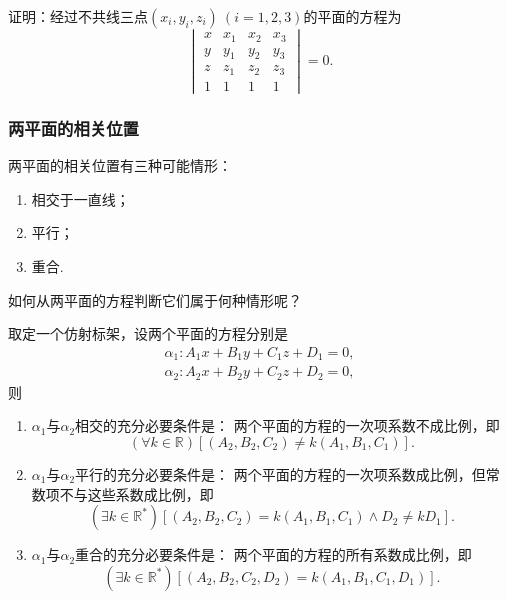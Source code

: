 \begin{example}
证明：经过不共线三点\((x_i,y_i,z_i)\ (i=1,2,3)\)的平面的方程为\[
	\begin{vmatrix}
		x & x_1 & x_2 & x_3 \\
		y & y_1 & y_2 & y_3 \\
		z & z_1 & z_2 & z_3 \\
		1 & 1 & 1 & 1
	\end{vmatrix} = 0.
\]
\end{example}

\subsubsection{两平面的相关位置}
两平面的相关位置有三种可能情形：
\begin{enumerate}
	\item 相交于一直线；
	\item 平行；
	\item 重合.
\end{enumerate}
如何从两平面的方程判断它们属于何种情形呢？

\begin{theorem}
取定一个仿射标架，设两个平面的方程分别是\[
	\begin{split}
		\alpha_1: A_1 x + B_1 y + C_1 z + D_1 = 0, \\
		\alpha_2: A_2 x + B_2 y + C_2 z + D_2 = 0,
	\end{split}
\]
则\begin{enumerate}
	\item \(\alpha_1\)与\(\alpha_2\)相交的充分必要条件是：
	两个平面的方程的一次项系数不成比例，即\[
		(\forall k \in \mathbb{R})
		[(A_2,B_2,C_2) \neq k (A_1,B_1,C_1)].
	\]
	\item \(\alpha_1\)与\(\alpha_2\)平行的充分必要条件是：
	两个平面的方程的一次项系数成比例，但常数项不与这些系数成比例，即\[
		(\exists k \in \mathbb{R}^*)
		[(A_2,B_2,C_2) = k (A_1,B_1,C_1)
		\land D_2 \neq k D_1].
	\]
	\item \(\alpha_1\)与\(\alpha_2\)重合的充分必要条件是：
	两个平面的方程的所有系数成比例，即\[
		(\exists k \in \mathbb{R}^*)
		[(A_2,B_2,C_2,D_2) = k (A_1,B_1,C_1,D_1)].
	\]
\end{enumerate}
\end{theorem}

